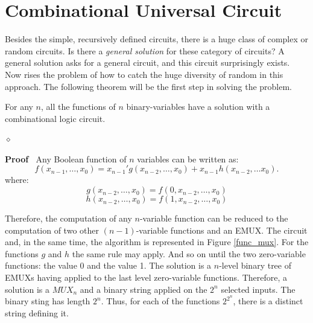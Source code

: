 {

}%





\section{Combinational Universal Circuit}

Besides the simple, recursively defined circuits, there is a huge
class of complex or random circuits. Is there a {\em general
solution} for these category of circuits? A general solution asks
for a general circuit, and this circuit surprisingly exists. Now rises
the problem of how to catch the huge diversity of random in this
approach. The following theorem will be the first step in solving
the problem.

\begin{theorem}
For any $n$, all the functions of $n$ binary-variables have a
solution  with a combinational logic circuit.

$\diamond$
\end{theorem}

{\bf Proof}$\;\;$ Any Boolean function of $n$  variables can be
written as:
$$f(x_{n-1}, \ldots , x_{0}) = x_{n-1}'g(x_{n-2}, \ldots,x_{0}) + x_{n-1}h(x_{n-2}, \ldots x_{0}).$$
where:
$$g(x_{n-2}, \ldots,x_{0}) = f(0, x_{n-2}, \ldots , x_{0})$$
$$h(x_{n-2}, \ldots,x_{0}) = f(1, x_{n-2}, \ldots , x_{0})$$


Therefore, the computation of  any  $n$-variable function can be
reduced to the computation of two other $(n-1)$-variable
functions and an EMUX. The circuit and, in the same time, the
algorithm is represented in Figure \ref{func_mux}. For the
functions $g$ and $h$ the same rule may apply. And so on until
the two zero-variable functions: the value 0 and the value 1. The
solution is a $n$-level binary tree of EMUXs having applied to
the last level zero-variable functions. Therefore, a solution is a
$MUX_{n}$ and a binary string applied on the $2^{n}$ selected
inputs. The binary sting has length $2^{n}$. Thus, for each of
the functions $2^{2^{n}}$, there is a distinct string defining it.

